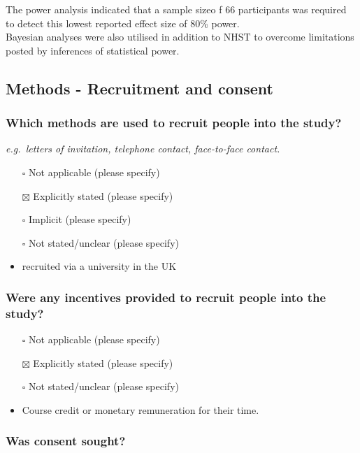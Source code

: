 \documentclass[
  doc, a4paper]{apa7}
\begin{document}
The power analysis indicated that a sample sizeo f 66 participants was required to detect this lowest reported effect size of 80\% power.\\
Bayesian analyses were also utilised in addition to NHST to overcome limitations posted by inferences of statistical power.

\subsection{Methods - Recruitment and consent}\label{methods---recruitment-and-consent}

\subsubsection{Which methods are used to recruit people into the study?}\label{which-methods-are-used-to-recruit-people-into-the-study}

\emph{e.g.~letters of invitation, telephone contact, face-to-face contact.}

\begin{itemize}
\item[$\square$]
  Not applicable (please specify)
\item[$\boxtimes$]
  Explicitly stated (please specify)
\item[$\square$]
  Implicit (please specify)
\item[$\square$]
  Not stated/unclear (please specify)
\item
  recruited via a university in the UK
\end{itemize}

\subsubsection{Were any incentives provided to recruit people into the study?}\label{were-any-incentives-provided-to-recruit-people-into-the-study}

\begin{itemize}
\item[$\square$]
  Not applicable (please specify)
\item[$\boxtimes$]
  Explicitly stated (please specify)
\item[$\square$]
  Not stated/unclear (please specify)
\item
  Course credit or monetary remuneration for their time.
\end{itemize}

\subsubsection{Was consent sought?}\label{was-consent-sought}
\end{document}
